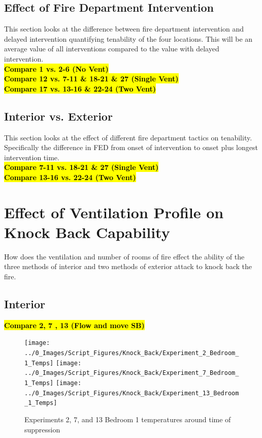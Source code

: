 \documentclass[12pt,oneside]{book}
\begin{document}
\clearpage

\subsection{Effect of Fire Department Intervention}
This section looks at the difference between fire department intervention and delayed intervention quantifying tenability of the four locations. This will be an average value of all interventions compared to the value with delayed intervention. \\
\textbf{\hl{Compare 1 vs. 2-6 (No Vent)}} \\
\textbf{\hl{Compare 12 vs. 7-11 \& 18-21 \& 27 (Single Vent)}} \\
\textbf{\hl{Compare 17 vs. 13-16 \& 22-24 (Two Vent)}} \\

\subsection{Interior vs. Exterior}
This section looks at the effect of different fire department tactics on tenability. Specifically the difference in FED from onset of intervention to onset plus longest intervention time. \\
\textbf{\hl{Compare 7-11 vs. 18-21 \& 27 (Single Vent)}} \\
\textbf{\hl{Compare 13-16 vs. 22-24 (Two Vent)}} \\

\section{Effect of Ventilation Profile on Knock Back Capability}
How does the ventilation and number of rooms of fire effect the ability of the three methods of interior and two methods of exterior attack to knock back the fire. 

\subsection{Interior}
\textbf{\hl{Compare 2, 7 , 13 (Flow and move SB)}} \\

\begin{figure}[H]
	\centering
	\texttt{[image: ../0\_Images/Script\_Figures/Knock\_Back/Experiment\_2\_Bedroom\_1\_Temps]}
	\texttt{[image: ../0\_Images/Script\_Figures/Knock\_Back/Experiment\_7\_Bedroom\_1\_Temps]}
	\texttt{[image: ../0\_Images/Script\_Figures/Knock\_Back/Experiment\_13\_Bedroom\_1\_Temps]}
	\caption[]{Experiments 2, 7, and 13 Bedroom 1 temperatures around time of suppression}
	\label{fig:knockback_plots_1}
\end{figure}
\clearpage
\end{document}
